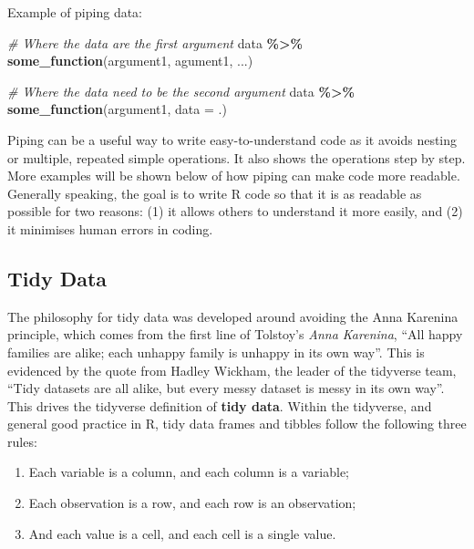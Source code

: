\documentclass[
]{book}
\newenvironment{Shaded}{\begin{snugshade}}{\end{snugshade}}
\newcommand{\AttributeTok}[1]{\textcolor[rgb]{0.13,0.29,0.53}{#1}}
\newcommand{\CommentTok}[1]{\textcolor[rgb]{0.56,0.35,0.01}{\textit{#1}}}
\newcommand{\FunctionTok}[1]{\textcolor[rgb]{0.13,0.29,0.53}{\textbf{#1}}}
\newcommand{\NormalTok}[1]{#1}
\newcommand{\SpecialCharTok}[1]{\textcolor[rgb]{0.81,0.36,0.00}{\textbf{#1}}}
\providecommand{\tightlist}{%
  \setlength{\itemsep}{0pt}\setlength{\parskip}{0pt}}
\begin{document}
Example of piping data:

\begin{Shaded}
\begin{Highlighting}[]
\CommentTok{\# Where the data are the first argument}
\NormalTok{data }\SpecialCharTok{\%\textgreater{}\%} \FunctionTok{some\_function}\NormalTok{(argument1, agument1, ...)}

\CommentTok{\# Where the data need to be the second argument }
\NormalTok{data }\SpecialCharTok{\%\textgreater{}\%} \FunctionTok{some\_function}\NormalTok{(argument1, }\AttributeTok{data =}\NormalTok{ .)}
\end{Highlighting}
\end{Shaded}

Piping can be a useful way to write easy-to-understand code as it avoids nesting or multiple, repeated simple operations. It also shows the operations step by step. More examples will be shown below of how piping can make code more readable. Generally speaking, the goal is to write R code so that it is as readable as possible for two reasons: (1) it allows others to understand it more easily, and (2) it minimises human errors in coding.

\subsection{Tidy Data}\label{sec:tidyData}

The philosophy for tidy data was developed around avoiding the Anna Karenina principle, which comes from the first line of Tolstoy's \emph{Anna Karenina}, ``All happy families are alike; each unhappy family is unhappy in its own way''. This is evidenced by the quote from Hadley Wickham, the leader of the tidyverse team, ``Tidy datasets are all alike, but every messy dataset is messy in its own way''. This drives the tidyverse definition of \textbf{tidy data}. Within the tidyverse, and general good practice in R, tidy data frames and tibbles follow the following three rules:

\begin{enumerate}
\def\labelenumi{\arabic{enumi}.}
\tightlist
\item
  Each variable is a column, and each column is a variable;
\item
  Each observation is a row, and each row is an observation;
\item
  And each value is a cell, and each cell is a single value.
\end{enumerate}
\end{document}
